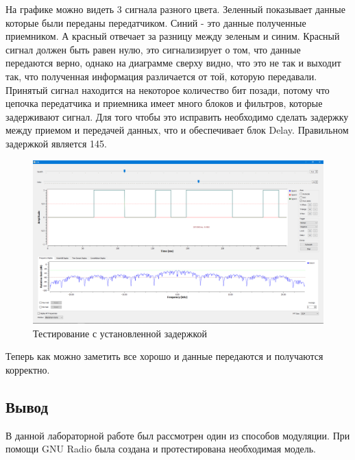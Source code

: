 На графике можно видеть 3 сигнала разного цвета. Зеленный показывает данные которые были переданы передатчиком. Синий - это данные полученные приемником. А красный отвечает за разницу между зеленым и синим. Красный сигнал должен быть равен нулю, это сигнализирует о том, что данные передаются верно, однако на диаграмме сверху видно, что это не так и выходит так, что полученная информация различается от той, которую передавали. Принятый сигнал находится на некоторое количество бит позади, потому что цепочка передатчика и приемника имеет много блоков и фильтров, которые задерживают сигнал. Для того чтобы это исправить необходимо сделать задержку между приемом и передачей данных, что и обеспечивает блок Delay. Правильном задержкой является 145. 


    \begin{figure}[H]
	\begin{center}
		\includegraphics[scale=0.27]{fig/lab12/lab12_04.png}
		\caption{Тестирование с установленной задержкой}
		\label{pic:e1} %
	\end{center}
\end{figure}

Теперь как можно заметить все хорошо и данные передаются и получаются корректно. 

\subsection{Вывод}
В данной лабораторной работе был рассмотрен один из способов модуляции. При помощи GNU Radio была создана и протестирована необходимая модель. 